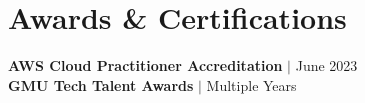 \documentclass[letterpaper,11pt]{article}
\begin{document}
\section{Awards \& Certifications}
 \begin{itemize}[leftmargin=0.15in, label={}]
    \small{\item{
     {\textbf{AWS Cloud Practitioner Accreditation} $|$ {June 2023}} \\ 
     {\textbf{GMU Tech Talent Awards} $|$ {Multiple Years}}
    }}
 \end{itemize}


\end{document}
